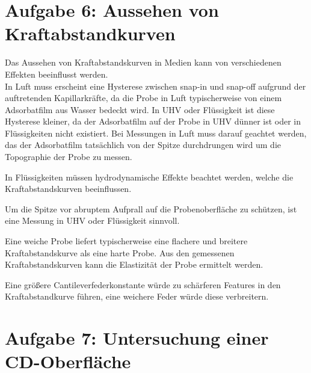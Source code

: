 \section{Aufgabe 6: Aussehen von Kraftabstandkurven}

Das Aussehen von Kraftabstandskurven in Medien kann von verschiedenen Effekten beeinflusst werden. \\

In Luft muss erscheint eine Hysterese zwischen snap-in und snap-off aufgrund der auftretenden Kapillarkräfte, da die Probe in Luft typischerweise von einem Adsorbatfilm aus Wasser bedeckt wird. In UHV oder Flüssigkeit ist diese Hysterese kleiner, da der Adsorbatfilm auf der Probe in UHV dünner ist oder in Flüssigkeiten nicht existiert. Bei Messungen in Luft muss darauf geachtet werden, das der Adsorbatfilm tatsächlich von der Spitze durchdrungen wird um die Topographie der Probe zu messen. 

In Flüssigkeiten müssen hydrodynamische Effekte beachtet werden, welche die Kraftabstandskurven beeinflussen. 

Um die Spitze vor abruptem Aufprall auf die Probenoberfläche zu schützen, ist eine Messung in UHV oder Flüssigkeit sinnvoll. 

Eine weiche Probe liefert typischerweise eine flachere und breitere Kraftabstandskurve als eine harte Probe. Aus den gemessenen Kraftabstandskurven kann die Elastizität der Probe ermittelt werden. 

Eine größere Cantileverfederkonstante würde zu schärferen Features in den Kraftabstandkurve führen, eine weichere Feder würde diese verbreitern.


\section{Aufgabe 7: Untersuchung einer CD-Oberfläche}

